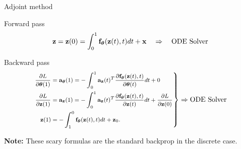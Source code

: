 \begin{frame}{Adjoint method}
	\begin{block}{Forward pass}
		\vspace{-0.3cm}
		\[
		\mathbf{z} = \mathbf{z}(0) = \int^{1}_{0} \mathbf{f}_{\boldsymbol{\theta}}(\mathbf{z}(t), t) d t  + \mathbf{x} \quad \Rightarrow \quad \text{ODE Solver}
		\]
		\vspace{-0.4cm}
	\end{block}
	\begin{block}{Backward pass}
		\vspace{-0.5cm}
		\begin{equation*}
			\left.
			{\footnotesize 
				\begin{aligned}
					\frac{\partial L}{\partial \boldsymbol{\theta}(1)} &= \mathbf{a}_{\boldsymbol{\theta}}(1) =  - \int_{0}^{1} \mathbf{a}_{\mathbf{z}}(t)^T \frac{\partial \mathbf{f}_{\boldsymbol{\theta}}(\mathbf{z}(t), t)}{\partial \boldsymbol{\theta}(t)} dt + 0 \\
					\frac{\partial L}{\partial \mathbf{z}(1)} &= \mathbf{a}_{\mathbf{z}}(1) =  - \int_{0}^{1} \mathbf{a}_{\mathbf{z}}(t)^T \frac{\partial \mathbf{f}_{\boldsymbol{\theta}}(\mathbf{z}(t), t)}{\partial \mathbf{z}(t)} dt + \frac{\partial L}{\partial \mathbf{z}(0)} \\
					\mathbf{z}(1) &= - \int^{0}_{1} \mathbf{f}_{\boldsymbol{\theta}}(\mathbf{z}(t), t) d t  + \mathbf{z}_0.
				\end{aligned}
			}
			\right\rbrace
			\Rightarrow
			\text{ODE Solver}
		\end{equation*}
		\vspace{-0.4cm} 
	\end{block}
	\textbf{Note:} These scary formulas are the standard backprop in the discrete case.
\end{frame}
